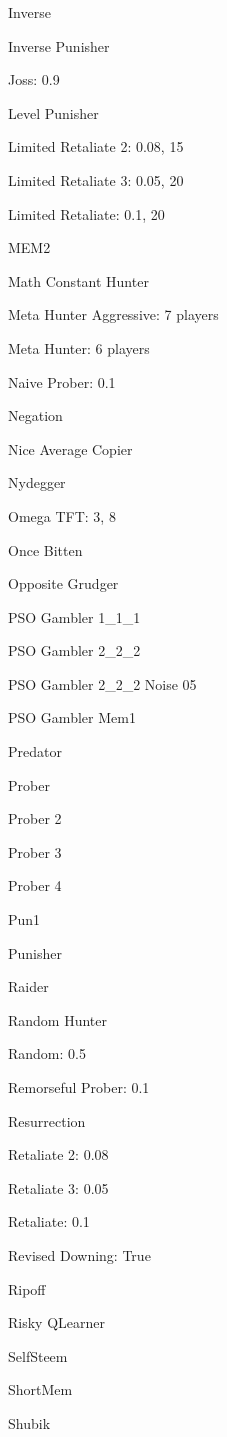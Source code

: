 \item Inverse
\item Inverse Punisher
\item Joss: 0.9
\item Level Punisher
\item Limited Retaliate 2: 0.08, 15
\item Limited Retaliate 3: 0.05, 20
\item Limited Retaliate: 0.1, 20
\item MEM2
\item Math Constant Hunter
\item Meta Hunter Aggressive: 7 players
\item Meta Hunter: 6 players
\item Naive Prober: 0.1
\item Negation
\item Nice Average Copier
\item Nydegger
\item Omega TFT: 3, 8
\item Once Bitten
\item Opposite Grudger
\item PSO Gambler 1\_1\_1
\item PSO Gambler 2\_2\_2
\item PSO Gambler 2\_2\_2 Noise 05
\item PSO Gambler Mem1
\item Predator
\item Prober
\item Prober 2
\item Prober 3
\item Prober 4
\item Pun1
\item Punisher
\item Raider
\item Random Hunter
\item Random: 0.5
\item Remorseful Prober: 0.1
\item Resurrection
\item Retaliate 2: 0.08
\item Retaliate 3: 0.05
\item Retaliate: 0.1
\item Revised Downing: True
\item Ripoff
\item Risky QLearner
\item SelfSteem
\item ShortMem
\item Shubik
